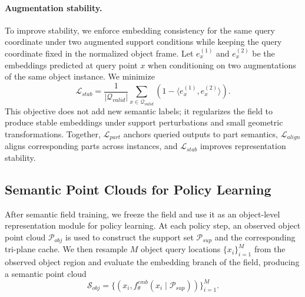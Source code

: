   \paragraph{Augmentation stability.}
  To improve stability, we enforce embedding consistency for the same query coordinate under two augmented support conditions while keeping the query coordinate fixed in the normalized object frame. Let $e_x^{(1)}$ and $e_x^{(2)}$ be the
  embeddings predicted at query point $x$ when conditioning on two augmentations of the same object instance. We minimize
  \begin{equation}
      \mathcal{L}_{stab}
      =
      \frac{1}{|\mathcal{Q}_{valid}|}
      \sum_{x \in \mathcal{Q}_{valid}}
      \left(
          1 - \langle e_x^{(1)}, e_x^{(2)} \rangle
      \right).
  \end{equation}
  This objective does not add new semantic labels; it regularizes the field to produce stable embeddings under support perturbations and small geometric transformations.
  Together, $\mathcal{L}_{part}$ anchors queried outputs to part semantics, $\mathcal{L}_{align}$ aligns corresponding parts across instances, and $\mathcal{L}_{stab}$ improves representation stability.



\subsection{Semantic Point Clouds for Policy Learning}
\label{sec:method_policy}


After semantic field training, we freeze the field and use it as an object-level representation module for policy learning. At each policy step, an observed object point cloud $\mathcal{P}_{obj}$ is used to construct the support set $\mathcal{P}_{sup}$ and the corresponding tri-plane cache. We then resample $M$ object query locations $\{x_i\}_{i=1}^{M}$ from the observed object region and evaluate the embedding branch of the field, producing a semantic point cloud
  \begin{equation}
    \mathcal{S}_{obj}=\{(x_i, f_\theta^{emb}(x_i\mid\mathcal{P}_{sup}))\}_{i=1}^{M}.
  \end{equation}


